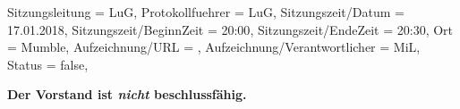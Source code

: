 
\begin{Protokoll}{
        Sitzungsleitung                 = {LuG},             %
        Protokollfuehrer                = {LuG},              %
        Sitzungszeit/Datum              = {17.01.2018},       %
        Sitzungszeit/BeginnZeit         = {20:00},            %
        Sitzungszeit/EndeZeit           = {20:30},            %
        Ort                             = {Mumble},            %
        Aufzeichnung/URL                = {},                %
        Aufzeichnung/Verantwortlicher   = {MiL},                  %
        Status                          = {false},            %
    }
    
    \begin{Anwesenheitsliste}
    \end{Anwesenheitsliste}
    
    \textbf{Der Vorstand ist \emph{nicht} beschlussfähig.} 
    
    
\end{Protokoll}


